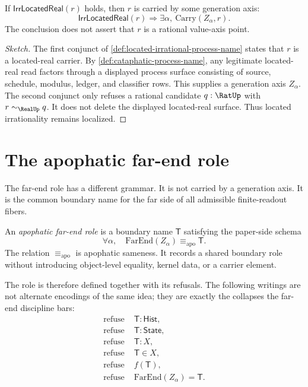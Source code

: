 \begin{theorem}
\label{thm:located-irrationality-remains-localized}
If $\mathsf{IrrLocatedReal}(r)$ holds, then $r$ is carried by some generation
axis:
$$
\mathsf{IrrLocatedReal}(r)
\Longrightarrow
\exists \alpha,\ \mathrm{Carry}(Z_\alpha,r).
$$
The conclusion does not assert that $r$ is a rational value-axis point.
\end{theorem}

\begin{proof}[Sketch]
The first conjunct of \autoref{def:located-irrational-process-name} states
that $r$ is a located-real carrier. By
\autoref{def:cataphatic-process-name}, any legitimate located-real read
factors through a displayed process surface consisting of source, schedule,
modulus, ledger, and classifier rows. This supplies a generation axis
$Z_\alpha$. The second conjunct only refuses a rational candidate $q:\RatUp$
with $r\sim_{\RealUp}q$. It does not delete the displayed located-real
surface. Thus located irrationality remains localized.
\end{proof}

\section{The apophatic far-end role}
\label{sec:cataphatic-process-apophatic-far-end-role}

The far-end role has a different grammar. It is not carried by a generation
axis. It is the common boundary name for the far side of all admissible
finite-readout fibers.

\begin{definition}
\label{def:cataphatic-process-apophatic-far-end-role}
An \emph{apophatic far-end role} is a boundary name $\mathsf{T}$ satisfying
the paper-side schema
$$
\forall \alpha,\quad
\mathrm{FarEnd}(Z_\alpha)\equiv_{\mathrm{apo}}\mathsf{T}.
$$
The relation $\equiv_{\mathrm{apo}}$ is apophatic sameness. It records a
shared boundary role without introducing object-level equality, kernel data,
or a carrier element.
\end{definition}

The role is therefore defined together with its refusals. The following
writings are not alternate encodings of the same idea; they are exactly the
collapses the far-end discipline bars:
$$
\begin{aligned}
\text{refuse }&\mathsf{T}:\mathsf{Hist},\\
\text{refuse }&\mathsf{T}:\mathsf{State},\\
\text{refuse }&\mathsf{T}:X,\\
\text{refuse }&\mathsf{T}\in X,\\
\text{refuse }&f(\mathsf{T}),\\
\text{refuse }&\mathrm{FarEnd}(Z_\alpha)=\mathsf{T}.
\end{aligned}
$$

